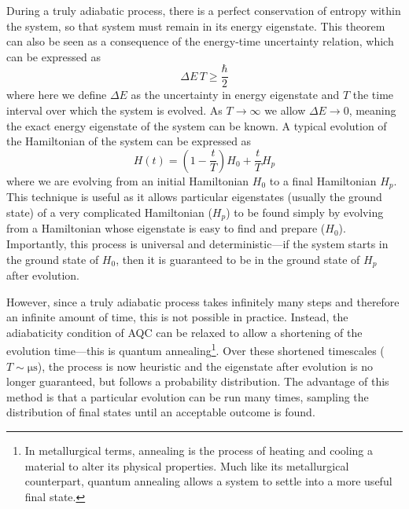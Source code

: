 \documentclass[12pt]{article}
\theoremstyle{definition}
\begin{document}
During a truly adiabatic process, there is a perfect conservation of entropy within the system, so that system must remain in its energy eigenstate. This theorem can also be seen as a consequence of the energy-time uncertainty relation, which can be expressed as
\begin{equation}
    \Delta E\,T \ge \frac{\hbar}{2}
    \label{eq:energy-time}
\end{equation}
where here we define $\Delta E$ as the uncertainty in energy eigenstate and $T$ the time interval over which the system is evolved. As $T\to\infty$ we allow $\Delta E\to0$, meaning the exact energy eigenstate of the system can be known. A typical evolution of the Hamiltonian of the system can be expressed as
\begin{equation}
    H(t)=\left(1- \frac{t}{T}\right)H_0 + \frac{t}{T}H_p
    \label{eq:time-evolution}
\end{equation}
where we are evolving from an initial Hamiltonian $H_0$ to a final Hamiltonian $H_p$.
This technique is useful as it allows particular eigenstates (usually the ground state) of a very complicated Hamiltonian ($H_p$) to be found simply by evolving from a Hamiltonian whose eigenstate is easy to find and prepare ($H_0$). Importantly, this process is universal and deterministic---if the system starts in the ground state of $H_0$, then it is guaranteed to be in the ground state of $H_p$ after evolution.

However, since a truly adiabatic process takes infinitely many steps and therefore an infinite amount of time, this is not possible in practice. Instead, the adiabaticity condition of AQC can be relaxed to allow a shortening of the evolution time---this is quantum annealing\footnote{In metallurgical terms, annealing is the process of heating and cooling a material to alter its physical properties. Much like its metallurgical counterpart, quantum annealing allows a system to settle into a more useful final state.}. Over these shortened timescales ($T\sim\unit{\us}$), the process is now heuristic and the eigenstate after evolution is no longer guaranteed, but follows a probability distribution. The advantage of this method is that a particular evolution can be run many times, sampling the distribution of final states until an acceptable outcome is found.
\end{document}
